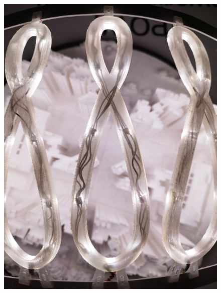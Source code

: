 \documentclass[a4paper,9pt]{article}
\begin{document}
\begin{minipage}{0.48\linewidth}
         \begin{figure}[H]
        \centering
        \includegraphics[width=.9\linewidth]{Images/e3.jpg}

    \end{figure}
    \end{minipage}
    \hfill
\end{document}
